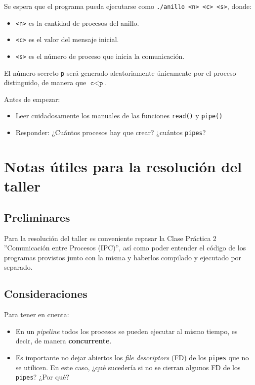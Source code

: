\documentclass[11pt]{article}
\begin{document}
Se espera que el programa pueda ejecutarse como \texttt{./anillo <n> <c> <s>}, donde:  

\begin{itemize}
  \item \texttt{<n>} es la cantidad de procesos del anillo.
  \item \texttt{<c>} es el valor del mensaje inicial.
  \item \texttt{<s>} es el número de proceso que inicia la comunicación.
\end{itemize}

El número secreto \texttt{p} será generado aleatoriamente únicamente por el proceso distinguido, de manera que $\texttt{c} < \texttt{p}$.

Antes de empezar:
\begin{itemize}
	\item Leer cuidadosamente los manuales de las funciones \texttt{read()} y \texttt{pipe()}
	\item Responder: ¿Cuántos procesos hay que crear? ¿cuántos \texttt{pipes}?
\end{itemize}

\section{Notas útiles para la resolución del taller}

\subsection{Preliminares}
Para la resolución del taller es conveniente repasar la Clase Práctica 2 ''Comunicación entre Procesos (IPC)'', así como poder entender el código de los programas provistos junto con la misma y haberlos compilado y ejecutado por separado.

\subsection{Consideraciones}

Para tener en cuenta:

\begin{itemize}
	\item En un \textit{pipeline} todos los procesos se pueden ejecutar al mismo tiempo, es decir, de manera \textbf{concurrente}.
	\item Es importante no dejar abiertos los \textit{file descriptors} (FD) de los \texttt{pipes} que no se utilicen. En este caso, ¿qué sucedería si no se cierran algunos FD de los \texttt{pipes}? ¿Por qué?
\end{itemize}
\end{document}
